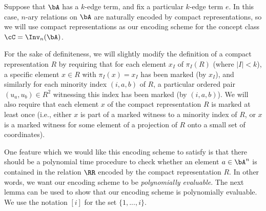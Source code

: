 Suppose that $\bA$ has a $k$-edge term, and fix a particular $k$-edge term $e$. In this case, $n$-ary relations on $\bA$ are naturally encoded by compact representations, so we will use compact representations as our encoding scheme for the concept class $\cC = \Inv_n(\bA)$.

For the sake of definiteness, we will slightly modify the definition of a compact representation $R$ by requiring that for each element $x_I$ of $\pi_I(R)$ (where $|I| < k$), a specific element $x \in R$ with $\pi_I(x) = x_I$ has been marked (by $x_I$), and similarly for each minority index $(i,a,b)$ of $R$, a particular ordered pair $(u_a,u_b) \in R^2$ witnessing this index has been marked (by $(i,a,b)$). We will also require that each element $x$ of the compact representation $R$ is marked at least once (i.e., either $x$ is part of a marked witness to a minority index of $R$, or $x$ is a marked witness for some element of a projection of $R$ onto a small set of coordinates).

One feature which we would like this encoding scheme to satisfy is that there should be a polynomial time procedure to check whether an element $a \in \bA^n$ is contained in the relation $\RR$ encoded by the compact representation $R$. In other words, we want our encoding scheme to be \emph{polynomially evaluable}. The next lemma can be used to show that our encoding scheme is polynomially evaluable. We use the notation $[i]$ for the set $\{1, ..., i\}$.

